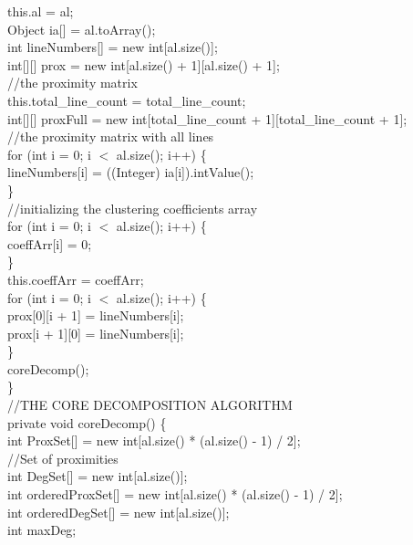 \begin{ttfamily   }
\begin{scriptsize}
        \noindent this.al = al;\\
        Object ia[] = al.toArray();\\

        \noindent int lineNumbers[] = new int[al.size()];\\
        int[][] prox = new int[al.size() + 1][al.size() + 1];\\\noindent//the proximity matrix\\
        this.total\_line\_count = total\_line\_count;\\
        int[][] proxFull = new int[total\_line\_count + 1][total\_line\_count + 1];\\\noindent//the proximity matrix with all lines\\

        \noindent for (int i = 0;   i $<$ al.size();   i++) \{\\
            lineNumbers[i] = ((Integer) ia[i]).intValue();\\
        \}\\

        \noindent//initializing the clustering coefficients array\\
        \noindent for (int i = 0;   i $<$ al.size();   i++) \{\\
            coeffArr[i] = 0;\\
        \}\\
        this.coeffArr = coeffArr;\\

        \noindent for (int i = 0;   i $<$ al.size();   i++) \{\\
            prox[0][i + 1] = lineNumbers[i];\\
            prox[i + 1][0] = lineNumbers[i];\\
        \}\\


        coreDecomp();\\
    \}\\

\noindent//THE CORE DECOMPOSITION ALGORITHM\\
   \noindent private void coreDecomp() \{\\
        int ProxSet[] = new int[al.size() * (al.size() - 1) / 2];\\ \noindent//Set of proximities\\
        int DegSet[] = new int[al.size()];\\
        int orderedProxSet[] = new int[al.size() * (al.size() - 1) / 2];\\
        int orderedDegSet[] = new int[al.size()];\\
        int maxDeg;\\


\end{scriptsize}
\end{ttfamily   }
